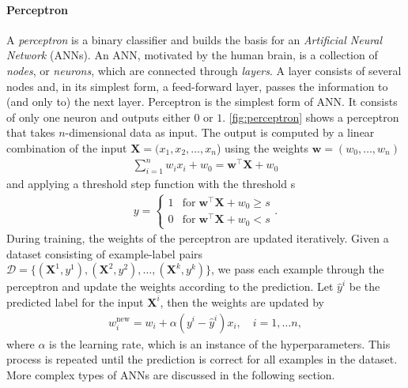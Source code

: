 \paragraph{Perceptron} A \textit{perceptron} is a binary classifier and builds the basis for an \textit{Artificial Neural Network} (ANNs). An ANN, motivated by the human brain, is a collection of \textit{nodes}, or \textit{neurons}, which are connected through \textit{layers}. A layer consists of several nodes and, in its simplest form, a feed-forward layer, passes the information to (and only to) the next layer. 
Perceptron is the simplest form of ANN. It consists of only one neuron and outputs either $0$ or $1$. \cref{fig:perceptron} shows a perceptron that takes $n$-dimensional data as input. The output is computed by a linear combination of the input $\mathbf{X}=(x_1,x_2,\dots,x_n$) using the weights $\mathbf{w}=(w_0, \dots, w_n)$ 
\begin{align}
    \sum_{i=1}^n w_i x_i + w_0 = \mathbf{w}^\top \mathbf{X} + w_0
\end{align}
and applying a threshold step function with the threshold s
\begin{align}
    y = 
        \begin{cases}
        1 & \mathrm{for}\; \mathbf{w}^\top \mathbf{X} + w_0 \geq s\\
        0 & \mathrm{for}\;  \mathbf{w}^\top \mathbf{X} + w_0 < s
        \end{cases}.
\end{align}
During training, the weights of the perceptron are updated iteratively. Given a dataset consisting of example-label pairs $\mathcal{D} = \{(\mathbf{X}^1, y^1), (\mathbf{X}^2, y^2), \dots, (\mathbf{X}^k, y^k)\}$, we pass each example through the perceptron and update the weights according to the prediction. Let $\hat{y}^i$ be the predicted label for the input $\mathbf{X}^i$, then the weights are updated by
\begin{align*}
w_i^{\mathrm{new}} = w_i + \alpha (y^i - \hat{y}^i)x_i, \quad i=1, \dots n, 
\end{align*}
where $\alpha$ is the learning rate, which is an instance of the hyperparameters. This process is repeated until the prediction is correct for all examples in the dataset.
More complex types of ANNs are discussed in the following section.

